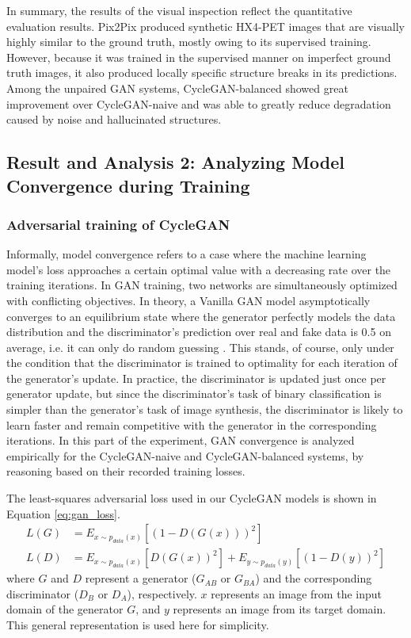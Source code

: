 In summary, the results of the visual inspection reflect the quantitative evaluation results. Pix2Pix produced synthetic HX4-PET images that are visually highly similar to the ground truth, mostly owing to its supervised training. However, because it was trained in the supervised manner on imperfect ground truth images, it also produced locally specific structure breaks in its predictions. Among the unpaired GAN systems, CycleGAN-balanced showed great improvement over CycleGAN-naive and was able to greatly reduce degradation caused by noise and hallucinated structures.


\subsection{Result and Analysis 2: Analyzing Model Convergence during Training}
\label{cycelgan_convergence}


\subsubsection{Adversarial training of CycleGAN} 
Informally, model convergence refers to a case where the machine learning model's loss approaches a certain optimal value with a decreasing rate over the training iterations. In GAN training, two networks are simultaneously optimized with conflicting objectives. In theory, a Vanilla GAN model asymptotically converges to an equilibrium state where the generator perfectly models the data distribution and the discriminator's prediction over real and fake data is 0.5 on average, i.e. it can only do random guessing \cite{goodfellow2014generative}. This stands, of course, only under the condition that the discriminator is trained to optimality for each iteration of the generator's update. In practice, the discriminator is updated just once per generator update, but since the discriminator's task of binary classification is simpler than the generator's task of image synthesis, the discriminator is likely to learn faster and remain competitive with the generator in the corresponding iterations. In this part of the experiment, GAN convergence is analyzed empirically for the CycleGAN-naive and CycleGAN-balanced systems, by reasoning based on their recorded training losses.

The least-squares adversarial loss used in our CycleGAN models is shown in Equation \ref{eq:gan_loss}.
\begin{equation}
    \begin{aligned}
    L(G) &= E_{x \sim p_{data}(x)} [(1 - D(G(x)))^2] \\
    L(D) &= E_{x \sim p_{data}(x)} [D(G(x))^2] + E_{y \sim p_{data}(y)} [(1 - D(y))^2] 
    \end{aligned}
    \label{eq:gan_loss}
\end{equation}
where $G$ and $D$ represent a generator ($G_{AB}$ or $G_{BA}$) and the corresponding discriminator ($D_B$ or $D_A$), respectively. $x$ represents an image from the input domain of the generator $G$, and $y$ represents an image from its target domain. This general representation is used here for simplicity. 


